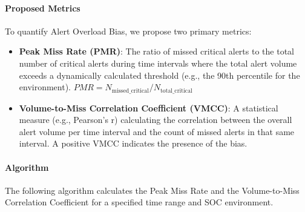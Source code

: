 \documentclass[11pt, a4paper]{article}
\begin{document}
\paragraph{Proposed Metrics}
To quantify Alert Overload Bias, we propose two primary metrics:
\begin{itemize}
    \item \textbf{Peak Miss Rate (PMR)}: The ratio of missed critical alerts to the total number of critical alerts during time intervals where the total alert volume exceeds a dynamically calculated threshold (e.g., the 90th percentile for the environment). \( PMR = N_{\text{missed\_critical}} / N_{\text{total\_critical}} \)
    \item \textbf{Volume-to-Miss Correlation Coefficient (VMCC)}: A statistical measure (e.g., Pearson's r) calculating the correlation between the overall alert volume per time interval and the count of missed alerts in that same interval. A positive VMCC indicates the presence of the bias.
\end{itemize}

\paragraph{Algorithm}
The following algorithm calculates the Peak Miss Rate and the Volume-to-Miss Correlation Coefficient for a specified time range and SOC environment.
\end{document}
